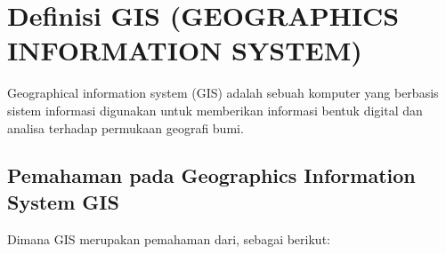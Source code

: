 
\section{Definisi GIS (GEOGRAPHICS INFORMATION SYSTEM)}
Geographical information system (GIS) adalah sebuah komputer yang berbasis sistem
informasi digunakan untuk memberikan informasi bentuk digital dan analisa terhadap 
permukaan geografi bumi.

\subsection{Pemahaman pada Geographics Information System GIS}
Dimana GIS merupakan pemahaman dari, sebagai berikut:
